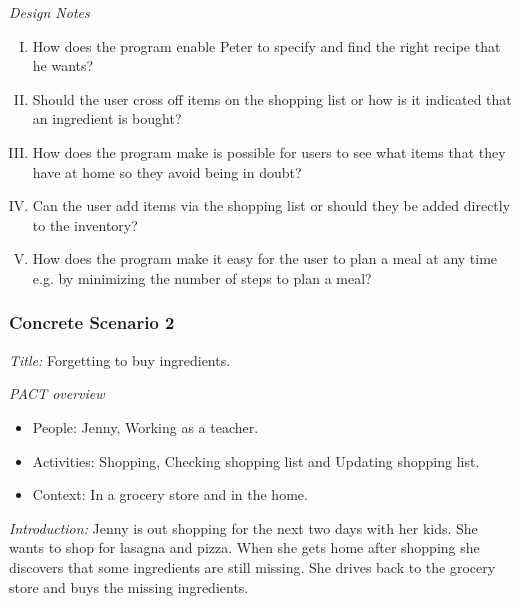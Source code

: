 \emph{Design Notes}

\begin{enumerate} [(I)]
\item How does the program enable Peter to specify and find the right recipe that he wants?
\item Should the user cross off items on the shopping list or how is it indicated that an ingredient is bought?
\item  How does the program make is possible for users to see what items that they have at home so they avoid being in doubt?
\item Can the user add items via the shopping list or should they be added directly to the inventory?
\item How does the program make it easy for the user to plan a meal at any time e.g. by minimizing the number of steps to plan a meal?
\end{enumerate}

\subsubsection{Concrete Scenario 2}\label{ConcreteScenario2}

\emph{Title:} Forgetting to buy ingredients.

\emph{PACT overview}
\begin{itemize}
\item People: Jenny, Working as a teacher.
\item Activities: Shopping, Checking shopping list and Updating shopping list. 
\item Context: In a grocery store and in the home.
\end{itemize}

\emph{Introduction:} Jenny is out shopping for the next two days with her kids. She wants to shop for lasagna and pizza. When she gets home after shopping she discovers that some ingredients are still missing. She drives back to the grocery store and buys the missing ingredients. 

